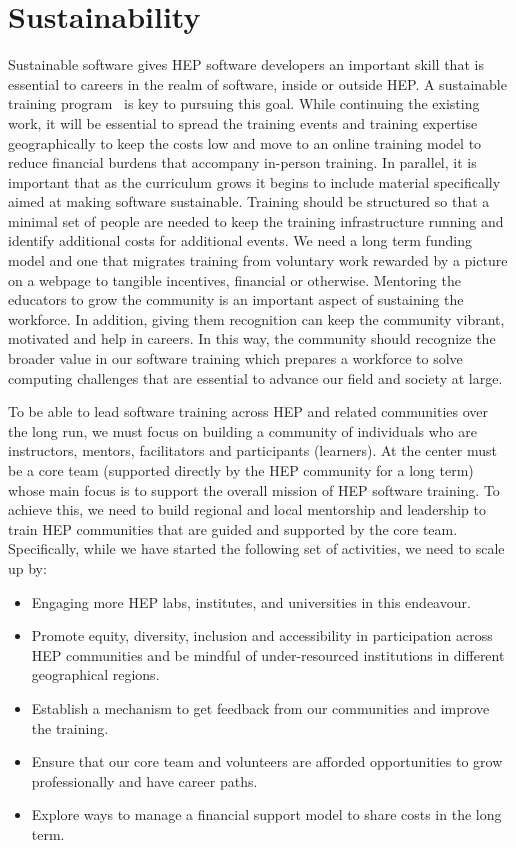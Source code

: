 \documentclass[twocolumn]{svjour3}          %
\begin{document}
\section{Sustainability}\label{sec:Sustainability}

Sustainable software \cite{dan_katz}  gives HEP software developers an important skill that is essential to careers in the realm of software, inside or outside HEP. A sustainable training program~\cite{sustainability_flashtalk} is key to pursuing this goal. While continuing the existing work, it will be essential to  spread the training events and training expertise geographically to keep the costs low and move to an online training model to reduce financial burdens that accompany in-person training. In parallel, it is important that as the curriculum grows it begins to include material specifically aimed at making software sustainable.  Training should be structured so that a minimal set of people are needed to keep the training infrastructure running and identify additional costs for additional events. We need a long term funding model and one that migrates training from voluntary work rewarded by a picture on a webpage to tangible incentives, financial or otherwise. Mentoring the educators to grow the community is an important aspect of sustaining the workforce. In addition, giving them recognition can keep the community vibrant, motivated and help in careers. In this way, the community should recognize the broader value in our software training which prepares a workforce to solve computing challenges that are essential to advance our field and society at large.

To be able to lead software training across HEP and related communities over the long run, we must focus on building a community of individuals who are instructors, mentors, facilitators and participants (learners).  At the center must be a core team (supported directly by the HEP community for a long term) whose main focus is to support the overall mission of HEP software training. To achieve this, we need to build regional and local mentorship and leadership to train HEP communities that are guided and supported by the core team. Specifically, while we have started the following set of activities, we need to scale up by:

\begin{itemize} 
 
\item Engaging more HEP labs, institutes, and universities in this endeavour. 
\item Promote equity, diversity, inclusion and accessibility in participation across HEP communities and  be mindful of under-resourced institutions in different geographical regions.
\item Establish a mechanism to get feedback from our communities and improve the training.
\item Ensure that our core team and volunteers are afforded opportunities to grow professionally and have career paths.
\item Explore ways to manage a financial support model to share costs in the long term.

\end{itemize}
\end{document}
